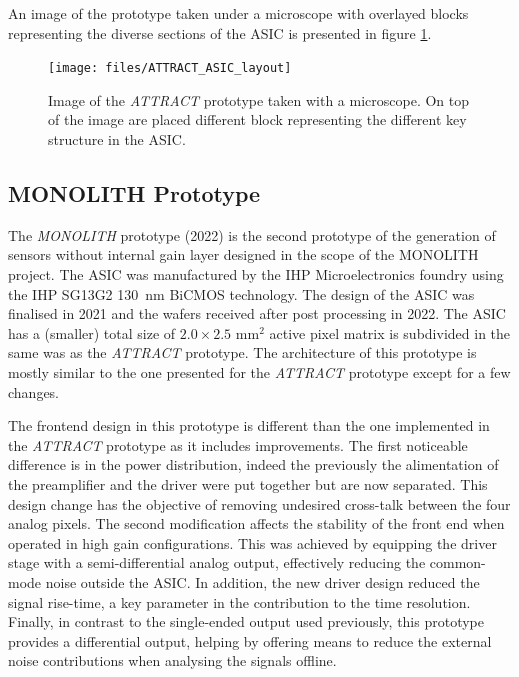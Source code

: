 		An image of the prototype taken under a microscope with overlayed blocks representing the diverse sections of the ASIC is presented in figure \ref{im:ATTRACT_ASIC_layout}.
		\begin{figure}[h]
			\centering
			\texttt{[image: files/ATTRACT\_ASIC\_layout]}
			\caption{Image of the \textit{ATTRACT} prototype taken with a microscope. On top of the image are placed different block representing the different key structure in the ASIC. }
			\label{im:ATTRACT_ASIC_layout}
		\end{figure} 
		
		
		
		
		\subsection{MONOLITH Prototype}
		
		The \textit{MONOLITH} prototype (2022) is the second prototype of the generation of sensors without internal gain layer designed in the scope of the MONOLITH project. The ASIC was manufactured by the IHP Microelectronics foundry using the IHP SG13G2 \SI{130}{\nano\meter} BiCMOS technology. The design of the ASIC was finalised in 2021 and the wafers received after post processing in 2022. The ASIC has a (smaller) total size of $2.0 \times 2.5$ mm$^2$ active pixel matrix is subdivided in the same was as the \textit{ATTRACT} prototype. The architecture of this prototype is mostly similar to the one presented for the \textit{ATTRACT} prototype except for a few changes.  
		
		The frontend design in this prototype is different than the one implemented in the \textit{ATTRACT} prototype as it includes improvements. The first noticeable difference is in the power distribution, indeed the previously the alimentation of the preamplifier and the driver were put together but are now separated. This design change has the objective of removing undesired cross-talk between the four analog pixels. The second modification affects the stability of the front end when operated in high gain configurations. This was achieved by equipping the driver stage with a semi-differential analog output, effectively reducing the common-mode noise outside the ASIC. In addition, the new driver design reduced the signal rise-time, a key parameter in the contribution to the time resolution. Finally, in contrast to the single-ended output used previously, this prototype provides a differential output, helping by offering means to reduce the external noise contributions when analysing the signals offline. 
		
